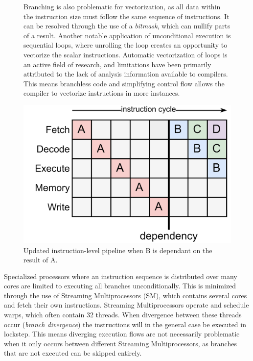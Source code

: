 \documentclass{article}
\begin{document}
\begin{figure}[ht]
    \begin{minipage}{.5\textwidth}
        Branching is also problematic for vectorization, as all data within the instruction size must follow the same sequence of instructions.
        It can be resolved through the use of a {\it bitmask}, which can nullify parts of a result\cite{assembly-optimizations}.  
        Another notable application of unconditional execution is sequential loops, where unrolling the loop creates an opportunity to vectorize the scalar instructions.
        Automatic vectorization of loops is an active field of research, and limitations have been primarily attributed to the lack of analysis information available to compilers\cite{automatic-vectorization}. 
        This means branchless code and simplifying control flow allows the compiler to vectorize instructions in more instances.   
    \end{minipage}%
    \begin{minipage}{.5\textwidth}
        \centering
        \includegraphics[scale=0.10]{Performance8.png}
        \captionsetup{margin=0.5cm}
        \captionsetup{format=plain}
        \caption
        { 
            Updated instruction-level pipeline when B is dependant on the result of A.
        }
    \end{minipage}
\end{figure}

\vspace{-0.5em}

Specialized processors where an instruction sequence is distributed over many cores are limited to executing all branches unconditionally.
This is minimized through the use of Streaming Multiprocessors (SM), which contains several cores and fetch their own instructions.
Streaming Multiprocessors operate and schedule warps, which often contain 32 threads.
When divergence between these threads occur ({\it branch divergence}) the instructions will in the general case be executed in lockstep\cite{threads-independent-scheduling}.
This means diverging execution flows are not necessarily problematic when it only occurs between different Streaming Multiprocessors, as branches that are not executed can be skipped entirely.
\end{document}
